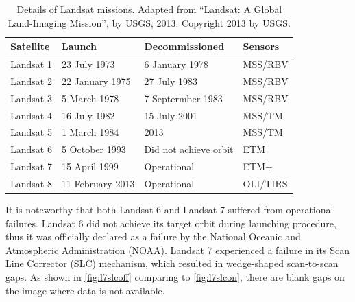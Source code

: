 \begin{table}[hbt]
\caption{Details of Landsat missions. Adapted from ``Landsat: A Global Land-Imaging Mission'', by USGS, 2013. Copyright 2013 by USGS.}
\begin{center}
\begin{tabular}{llll} 
\hline
\textbf{Satellite}&\textbf{Launch}&\textbf{Decommissioned}&\textbf{Sensors}\\
\hline
Landsat 1 & 23 July 1973 & 6 January 1978 & MSS/RBV \\
Landsat 2 & 22 January 1975 & 27 July 1983 & MSS/RBV \\
Landsat 3 & 5 March 1978 & 7 Septermber 1983 & MSS/RBV \\
Landsat 4 & 16 July 1982 & 15 July 2001 & MSS/TM \\
Landsat 5 & 1 March 1984 & 2013 & MSS/TM \\
Landsat 6 & 5 October 1993 & Did not achieve orbit & ETM\\
Landsat 7 & 15 April 1999 & Operational & ETM+ \\
Landsat 8 & 11 February 2013 & Operational & OLI/TIRS\\
\hline 
\end{tabular}
\end{center}
\label{table:landsatsum}
\end{table}
\newline
It is noteworthy that both Landsat 6 and Landsat 7 suffered from operational failures. Landsat 6 did not achieve its target orbit during launching procedure, thus it was officially declared as a failure by the National Oceanic and Atmospheric Administration (NOAA)\citep{Viets1995}. Landsat 7 experienced a failure in its Scan Line Corrector (SLC) mechanism, which resulted in wedge-shaped scan-to-scan gaps. As shown in \autoref{fig:l7slcoff} comparing to \autoref{fig:l7slcon}, there are blank gaps on the image where data is not available.
